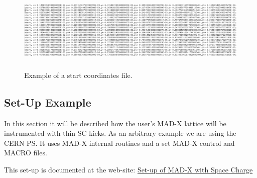 \begin{figure}[H]
\centering \includegraphics[height=4cm]{eps/start_coordinates}
\caption{Example of a start coordinates file.}
\label{START}
\end{figure}

\subsection{Set-Up Example}\label{SETUP}

In this section it will be described how the user's MAD-X lattice will
be instrumented with thin SC kicks. As an arbitrary example we are
using the CERN PS. It uses MAD-X internal routines and a set MAD-X
control and MACRO files.

This set-up is documented at the web-site:
\href{https://cernbox.cern.ch/index.php/s/olVfNdB8RsfYaCD}{Set-up of MAD-X with Space Charge}


